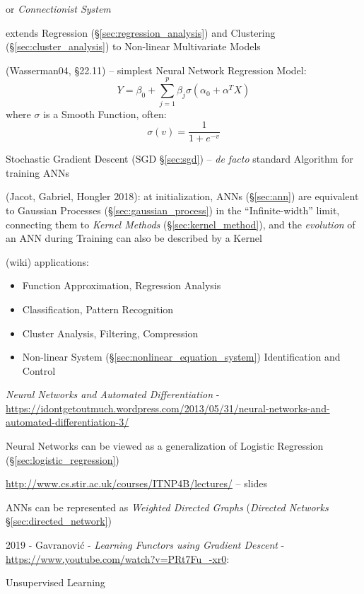 
or \emph{Connectionist System}

extends Regression (\S\ref{sec:regression_analysis}) and Clustering
(\S\ref{sec:cluster_analysis}) to Non-linear Multivariate Models

(Wasserman04, \S22.11) --
simplest Neural Network Regression Model:
\[
  Y = \beta_0 + \sum_{j=1}^p \beta_j \sigma (\alpha_0 + \alpha^T X)
\]
where $\sigma$ is a Smooth Function, often:
\[
  \sigma(v) = \frac{1}{1 + e^{-v}}
\]

Stochastic Gradient Descent (SGD \S\ref{sec:sgd}) -- \emph{de facto} standard
Algorithm for training ANNs

(Jacot, Gabriel, Hongler 2018): at initialization, ANNs (\S\ref{sec:ann}) are
equivalent to Gaussian Processes (\S\ref{sec:gaussian_process}) in the
``Infinite-width'' limit, connecting them to \emph{Kernel Methods}
(\S\ref{sec:kernel_method}), and the \emph{evolution} of an ANN during Training
can also be described by a Kernel

(wiki) applications:
\begin{itemize}
  \item Function Approximation, Regression Analysis
  \item Classification, Pattern Recognition
  \item Cluster Analysis, Filtering, Compression
  \item Non-linear System (\S\ref{sec:nonlinear_equation_system})
    Identification and Control
\end{itemize}

\emph{Neural Networks and Automated Differentiation} -
\url{https://idontgetoutmuch.wordpress.com/2013/05/31/neural-networks-and-automated-differentiation-3/}

Neural Networks can be viewed as a generalization of Logistic Regression
(\S\ref{sec:logistic_regression})

\asterism

\url{http://www.cs.stir.ac.uk/courses/ITNP4B/lectures/} -- slides

ANNs can be represented as \emph{Weighted Directed Graphs}
(\emph{Directed Networks} \S\ref{sec:directed_network})

\asterism

2019 - Gavranovi\'c - \emph{Learning Functors using Gradient Descent} -
\url{https://www.youtube.com/watch?v=PRt7Fu_-xr0}:

Unsupervised Learning

